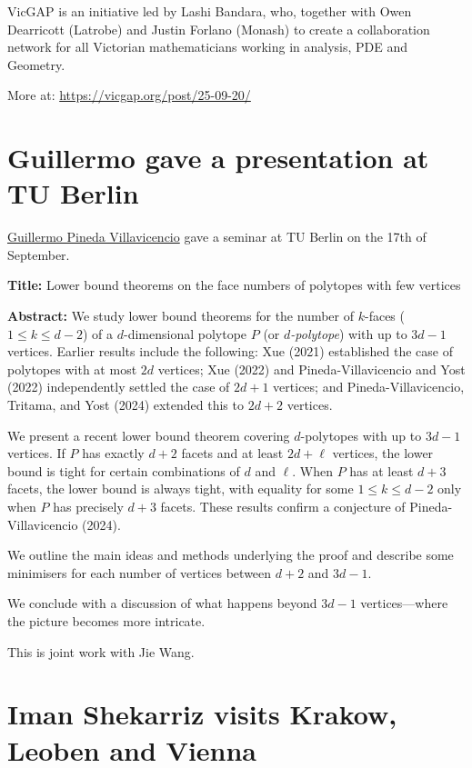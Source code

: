 \documentclass[10pt,twoside,a5paper]{scrreprt}
\begin{document}
  VicGAP is an initiative led by Lashi Bandara, who, together with Owen Dearricott (Latrobe) and Justin Forlano (Monash) to create a collaboration network for all Victorian mathematicians working in analysis, PDE and Geometry.

  More at: \href{https://vicgap.org/post/25-09-20/}{https://vicgap.org/post/25-09-20/}

   \section*{Guillermo gave a presentation at TU Berlin}

  \href{https://d-m-g.org/author/Guillermo-Pineda-Villavicencio}{Guillermo Pineda
  Villavicencio} gave a seminar at TU Berlin on the 17th of September.

  \textbf{Title:} Lower bound theorems on the face numbers of polytopes
  with few vertices

  \textbf{Abstract:} We study lower bound theorems for the number of
  \(k\)-faces (\(1\le k\le d-2\)) of a \(d\)-dimensional polytope \(P\)
  (or \emph{\(d\)-polytope}) with up to \(3d-1\) vertices. Earlier
  results include the following: Xue (2021) established the case of
  polytopes with at most \(2d\) vertices; Xue (2022) and
  Pineda-Villavicencio and Yost (2022) independently settled the case of
  \(2d+1\) vertices; and Pineda-Villavicencio, Tritama, and Yost (2024)
  extended this to \(2d+2\) vertices.

  We present a recent lower bound theorem covering \(d\)-polytopes with
  up to \(3d-1\) vertices. If \(P\) has exactly \(d+2\) facets and at
  least \(2d+\ell\) vertices, the lower bound is tight for certain
  combinations of \(d\) and \(\ell\). When \(P\) has at least \(d+3\)
  facets, the lower bound is always tight, with equality for some
  \(1\le k\le d-2\) only when \(P\) has precisely \(d+3\) facets. These
  results confirm a conjecture of Pineda-Villavicencio (2024).

  We outline the main ideas and methods underlying the proof and
  describe some minimisers for each number of vertices between \(d+2\)
  and \(3d-1\).

  We conclude with a discussion of what happens beyond \(3d-1\)
  vertices---where the picture becomes more intricate.

  This is joint work with Jie Wang.


  \section*{Iman Shekarriz visits Krakow, Leoben and
  Vienna}
\end{document}
